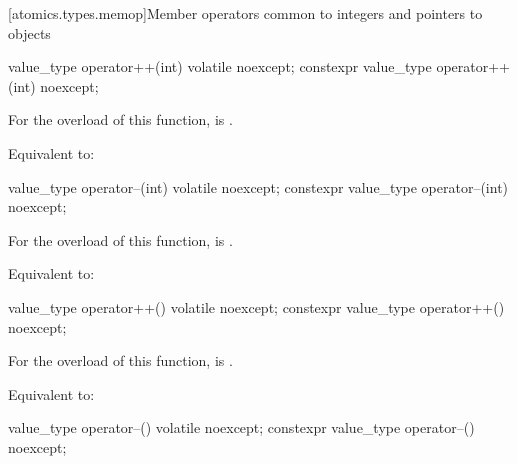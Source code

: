 [atomics.types.memop]{Member operators common to integers and pointers to objects}

%
%
\begin{itemdecl}
value_type operator++(int) volatile noexcept;
constexpr value_type operator++(int) noexcept;
\end{itemdecl}

\begin{itemdescr}
\pnum
\constraints
For the  overload of this function,
 is .

\pnum
\effects
Equivalent to: 
\end{itemdescr}

%
%
\begin{itemdecl}
value_type operator--(int) volatile noexcept;
constexpr value_type operator--(int) noexcept;
\end{itemdecl}

\begin{itemdescr}
\pnum
\constraints
For the  overload of this function,
 is .

\pnum
\effects
Equivalent to: 
\end{itemdescr}

%
%
\begin{itemdecl}
value_type operator++() volatile noexcept;
constexpr value_type operator++() noexcept;
\end{itemdecl}

\begin{itemdescr}
\pnum
\constraints
For the  overload of this function,
 is .

\pnum
\effects
Equivalent to: 
\end{itemdescr}

%
%
\begin{itemdecl}
value_type operator--() volatile noexcept;
constexpr value_type operator--() noexcept;
\end{itemdecl}


